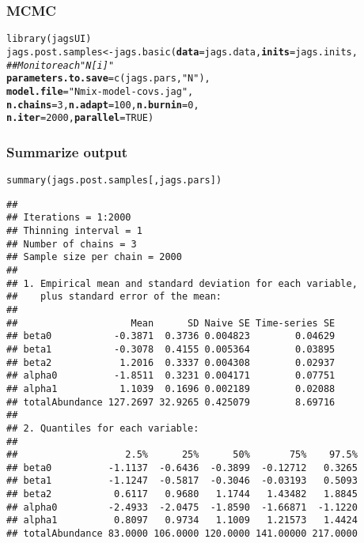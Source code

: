 \documentclass[color=usenames,dvipsnames]{beamer}\usepackage[]{graphicx}\usepackage[]{xcolor}
\makeatletter
\newcommand{\hlnum}[1]{\textcolor[rgb]{0.69,0.494,0}{#1}}%
\newcommand{\hlstr}[1]{\textcolor[rgb]{0.749,0.012,0.012}{#1}}%
\newcommand{\hlcom}[1]{\textcolor[rgb]{0.514,0.506,0.514}{\textit{#1}}}%
\newcommand{\hlstd}[1]{\textcolor[rgb]{0,0,0}{#1}}%
\newcommand{\hlkwb}[1]{\textcolor[rgb]{0,0.341,0.682}{#1}}%
\newcommand{\hlkwc}[1]{\textcolor[rgb]{0,0,0}{\textbf{#1}}}%
\newcommand{\hlkwd}[1]{\textcolor[rgb]{0.004,0.004,0.506}{#1}}%
\newenvironment{kframe}{%
 \def\at@end@of@kframe{}%
 \ifinner\ifhmode%
  \def\at@end@of@kframe{\end{minipage}}%
  \begin{minipage}{\columnwidth}%
 \fi\fi%
 \def\FrameCommand##1{\hskip\@totalleftmargin \hskip-\fboxsep
 \colorbox{shadecolor}{##1}\hskip-\fboxsep
     \hskip-\linewidth \hskip-\@totalleftmargin \hskip\columnwidth}%
 \MakeFramed {\advance\hsize-\width
   \@totalleftmargin\z@ \linewidth\hsize
   \@setminipage}}%
 {\par\unskip\endMakeFramed%
 \at@end@of@kframe}
\newenvironment{knitrout}{}{} %
\makeatother
\begin{document}
\begin{frame}[fragile]
  \frametitle{MCMC}
  \small
\begin{knitrout}\scriptsize
{}\color{fgcolor}\begin{kframe}
\begin{alltt}
\hlkwd{library}\hlstd{(jagsUI)}
\hlstd{jags.post.samples} \hlkwb{<-} \hlkwd{jags.basic}\hlstd{(}\hlkwc{data}\hlstd{=jags.data,} \hlkwc{inits}\hlstd{=jags.inits,}
                                \hlcom{## Monitor each "N[i]" }
                                \hlkwc{parameters.to.save}\hlstd{=}\hlkwd{c}\hlstd{(jags.pars,} \hlstr{"N"}\hlstd{),}
                                \hlkwc{model.file}\hlstd{=}\hlstr{"Nmix-model-covs.jag"}\hlstd{,}
                                \hlkwc{n.chains}\hlstd{=}\hlnum{3}\hlstd{,} \hlkwc{n.adapt}\hlstd{=}\hlnum{100}\hlstd{,} \hlkwc{n.burnin}\hlstd{=}\hlnum{0}\hlstd{,}
                                \hlkwc{n.iter}\hlstd{=}\hlnum{2000}\hlstd{,} \hlkwc{parallel}\hlstd{=}\hlnum{TRUE}\hlstd{)}
\end{alltt}
\end{kframe}
\end{knitrout}
\end{frame}



\begin{frame}[fragile]
  \frametitle{Summarize output}
\begin{knitrout}\tiny
{}\color{fgcolor}\begin{kframe}
\begin{alltt}
\hlkwd{summary}\hlstd{(jags.post.samples[,jags.pars])}
\end{alltt}
\begin{verbatim}
## 
## Iterations = 1:2000
## Thinning interval = 1 
## Number of chains = 3 
## Sample size per chain = 2000 
## 
## 1. Empirical mean and standard deviation for each variable,
##    plus standard error of the mean:
## 
##                    Mean      SD Naive SE Time-series SE
## beta0           -0.3871  0.3736 0.004823        0.04629
## beta1           -0.3078  0.4155 0.005364        0.03895
## beta2            1.2016  0.3337 0.004308        0.02937
## alpha0          -1.8511  0.3231 0.004171        0.07751
## alpha1           1.1039  0.1696 0.002189        0.02088
## totalAbundance 127.2697 32.9265 0.425079        8.69716
## 
## 2. Quantiles for each variable:
## 
##                   2.5%      25%      50%       75%    97.5%
## beta0          -1.1137  -0.6436  -0.3899  -0.12712   0.3265
## beta1          -1.1247  -0.5817  -0.3046  -0.03193   0.5093
## beta2           0.6117   0.9680   1.1744   1.43482   1.8845
## alpha0         -2.4933  -2.0475  -1.8590  -1.66871  -1.1220
## alpha1          0.8097   0.9734   1.1009   1.21573   1.4424
## totalAbundance 83.0000 106.0000 120.0000 141.00000 217.0000
\end{verbatim}
\end{kframe}
\end{knitrout}
\end{frame}
\end{document}
